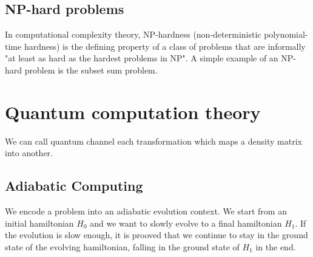 \documentclass[11pt]{article}
\begin{document}
\subsection{NP-hard problems}

In computational complexity theory, NP-hardness (non-deterministic 
polynomial-time hardness) is the defining property of a class of problems that 
are informally "at least as hard as the hardest problems in NP". A simple 
example of an NP-hard problem is the subset sum problem.

\section{Quantum computation theory}

We can call quantum channel each transformation which maps a density matrix into
another.

\subsection{Adiabatic Computing}

We encode a problem into an adiabatic evolution context. We start from an initial
hamiltonian $H_0$ and we want to slowly evolve to a final hamiltonian $H_1$. 
If the evolution is slow enough, it is prooved that we continue to stay in the 
ground state of the evolving hamiltonian, falling in the ground state of $H_1$ in 
the end.
\end{document}
